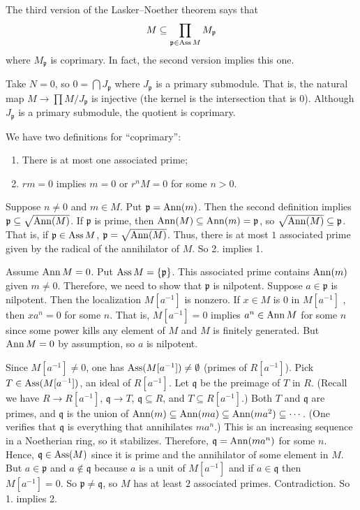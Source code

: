 \documentclass [11 pt, oneside, margin = 1 in] {article}
\begin{document}
The third version of the Lasker--Noether theorem says that
\begin{align*}
	M \subseteq \prod_{\mathfrak{p}\in \operatorname{Ass} M} M_{\mathfrak{p}}
\end{align*}
where $M_{\mathfrak{p}}$ is coprimary. In fact, the second version implies this one. 

Take $N=0$, so $0 = \bigcap J_{\mathfrak{p} }$ where $J_{\mathfrak{p}}$ is a primary submodule. That is, the natural map $M \longrightarrow \prod M/J_{\mathfrak{p}}$ is injective (the kernel is the intersection that is $0$). Although $J_{\mathfrak{p}}$ is a primary submodule, the quotient is coprimary.

We have two definitions for ``coprimary'':
\begin{enumerate}
	\item There is at most one associated prime;
	\item $rm = 0$ implies $m=0$ or $r^nM=0$ for some $n>0$.
\end{enumerate}

Suppose $n\ne 0$ and $m\in M$. Put $\mathfrak{p} = \operatorname{Ann}(m)$. Then the second definition implies $\mathfrak{p} \subseteq \sqrt{\operatorname{Ann} (M)} $. If $\mathfrak{p}$ is prime, then $\operatorname{Ann}(M)\subseteq \operatorname{Ann} (m)= \mathfrak{p}$, so $\sqrt{\operatorname{Ann}(M)}\subseteq \mathfrak{p} $. That is, if $\mathfrak{p}\in \operatorname{Ass} M$, $\mathfrak{p} = \sqrt{\operatorname{Ann} (M)} $. Thus, there is at most $1$ associated prime given by the radical of the annihilator of $M$. So 2. implies 1.

Assume $\operatorname{Ann} M=0$. Put $\operatorname{Ass} M = \{\mathfrak{p}\}$. This associated prime contains $\operatorname{Ann} (m)$ given $m\ne 0$. Therefore, we need to show that $\mathfrak{p}$ is nilpotent. Suppose $a\in \mathfrak{p}$ is nilpotent. Then the localization $M[a^{-1}]$ is nonzero. If $x\in M$ is $0$ in $M[a^{-1}]$ , then $xa^n=0$ for some $n$. That is, $M[a^{-1}]=0$ implies $a^n \in \operatorname{Ann} M$ for some $n$ since some power kills any element of $M$ and $M$ is finitely generated. But $\operatorname{Ann} M=0$ by assumption, so $a$ is nilpotent. 

Since $M[a^{-1}]\ne 0$, one has $\operatorname{Ass} (M[a^{-1}])\ne \emptyset$ (primes of $R[a^{-1}]$). Pick $T\in \operatorname{Ass} (M[a^{-1}])$, an ideal of $R[a^{-1}]$. Let $\mathfrak{q}$ be the preimage of $T$ in $R$. (Recall we have $R\longrightarrow  R[a^{-1}]$, $\mathfrak{q}\longrightarrow T$, $\mathfrak{q}\subseteq R$, and $T\subseteq R[a^{-1}]$.) Both $T$ and $\mathfrak{q}$ are primes, and $\mathfrak{q}$ is the union of $\operatorname{Ann}(m)\subseteq \operatorname{Ann} (ma)\subseteq \operatorname{Ann} (ma^2)\subseteq \cdots$. (One verifies that $\mathfrak{q}$ is everything that annihilates $ma^n$.) This is an increasing sequence in a Noetherian ring, so it stabilizes. Therefore, $\mathfrak{q}=\operatorname{Ann}(ma^n)$ for some $n$. Hence, $\mathfrak{q}\in \operatorname{Ass}(M)$ since it is prime and the annihilator of some element in $M$. But $a\in \mathfrak{p}$ and $a\notin \mathfrak{q}$ because $a$ is a unit of $M[a^{-1}]$ and if $a\in \mathfrak{q}$ then $M[a^{-1}]=0$. So $\mathfrak{p}\ne \mathfrak{q}$, so $M$ has at least $2$ associated primes. Contradiction. So 1. implies 2.
\end{document}
